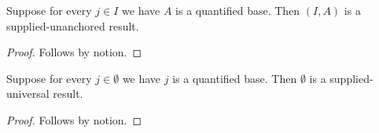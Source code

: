 \begin{theorem}\label{supplied_unanchored_whole}
    Suppose for every $j\in I$ we have $A$ is a quantified base.
    Then $(I,A)$ is a supplied-unanchored result.
\end{theorem}
\begin{proof}
    Follows by notion.
\end{proof}

\begin{theorem}\label{supplied_empty_bound}
    Suppose for every $j\in\emptyset$ we have $j$ is a quantified base.
    Then $\emptyset$ is a supplied-universal result.
\end{theorem}
\begin{proof}
    Follows by notion.
\end{proof}
